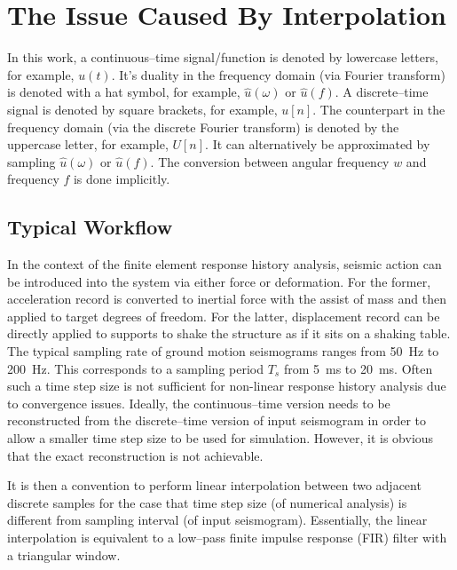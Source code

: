 \section{The Issue Caused By Interpolation}
In this work, a continuous--time signal/function is denoted by lowercase letters, for example, $u\left(t\right)$. It's duality in the frequency domain (via Fourier transform) is denoted with a hat symbol, for example, $\hat{u}\left(\omega\right)$ or $\hat{u}\left(f\right)$. A discrete--time signal is denoted by square brackets, for example, $u[n]$. The counterpart in the frequency domain (via the discrete Fourier transform) is denoted by the uppercase letter, for example, $U[n]$. It can alternatively be approximated by sampling $\hat{u}\left(\omega\right)$ or $\hat{u}\left(f\right)$. The conversion between angular frequency $w$ and frequency $f$ is done implicitly.
\subsection{Typical Workflow}
In the context of the finite element response history analysis, seismic action can be introduced into the system via either force or deformation. For the former, acceleration record is converted to inertial force with the assist of mass and then applied to target degrees of freedom. For the latter, displacement record can be directly applied to supports to shake the structure as if it sits on a shaking table.
The typical sampling rate of ground motion seismograms ranges from \SI{50}{\hertz} to \SI{200}{\hertz}. This corresponds to a sampling period $T_s$ from \SI{5}{\milli\second} to \SI{20}{\milli\second}. Often such a time step size is not sufficient for non-linear response history analysis due to convergence issues. Ideally, the continuous--time version needs to be reconstructed from the discrete--time version of input seismogram in order to allow a smaller time step size to be used for simulation. However, it is obvious that the exact reconstruction is not achievable.

It is then a convention to perform linear interpolation between two adjacent discrete samples for the case that time step size (of numerical analysis) is different from sampling interval (of input seismogram). Essentially, the linear interpolation is equivalent to a low--pass finite impulse response (FIR) filter with a triangular window.

